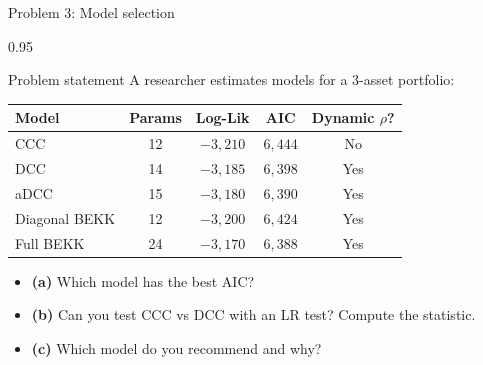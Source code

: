 \documentclass[9pt, aspectratio=169, t]{beamer}
\begin{document}
\begin{frame}{Problem 3: Model selection}
    \begin{cminipage}{0.95\textwidth}
    \begin{block}{Problem statement}
        A researcher estimates models for a 3-asset portfolio:

        \vspace{0.3cm}
        \begin{center}
        {\footnotesize
            \begin{tabular}{lcccc}
                \toprule
                \textbf{Model} & \textbf{Params} & \textbf{Log-Lik} & \textbf{AIC} & \textbf{Dynamic $\rho$?} \\
                \midrule
                CCC & 12 & $-3{,}210$ & $6{,}444$ & No \\
                DCC & 14 & $-3{,}185$ & $6{,}398$ & Yes \\
                aDCC & 15 & $-3{,}180$ & $6{,}390$ & Yes \\
                Diagonal BEKK & 12 & $-3{,}200$ & $6{,}424$ & Yes \\
                Full BEKK & 24 & $-3{,}170$ & $6{,}388$ & Yes \\
                \bottomrule
            \end{tabular}
        }
        \end{center}

        \vspace{0.3cm}
        \begin{itemize}\setlength{\itemsep}{0pt}
            \item \textbf{(a)} Which model has the best AIC?
            \item \textbf{(b)} Can you test CCC vs DCC with an LR test? Compute the statistic.
            \item \textbf{(c)} Which model do you recommend and why?
        \end{itemize}
    \end{block}
    \end{cminipage}
\end{frame}
\end{document}
